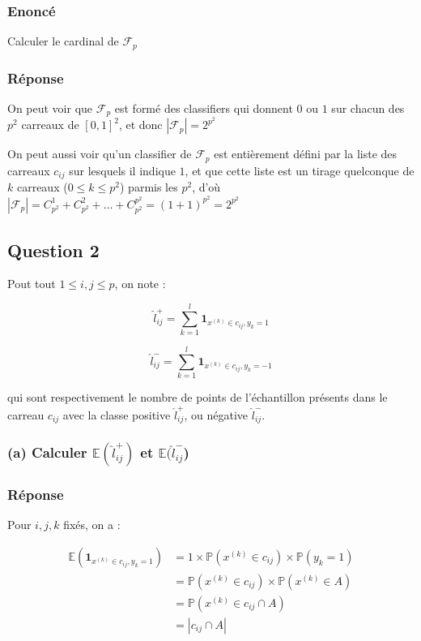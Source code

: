 \documentclass[french]{article}
\begin{document}
\subsubsection{Enoncé}

Calculer le cardinal de $\mathcal{F}_{p}$

\subsubsection{Réponse}

On peut voir que $\mathcal{F}_{p}$ est formé des classifiers qui donnent $0$ ou $1$ sur chacun des $ p^{2} $ carreaux de $[0,1]^{2}$, et donc $|\mathcal{F}_{p}| = 2^{p^{2}}$

On peut aussi voir qu'un classifier de $\mathcal{F}_{p}$ est entièrement défini par la liste des carreaux $ c_{ij} $ sur lesquels il indique $1$, et que cette liste est un tirage quelconque de $k$ carreaux ($0 \leq k \leq p^{2}$) parmis les $p^{2}$, d'où $|\mathcal{F}_{p}| = C_{p^{2}}^{1} + C_{p^{2}}^{2} + \hdots + C_{p^{2}}^{p^{2}} = (1+1)^{p^{2}} = 2^{p^{2}}$

\subsection{Question 2}

Pout tout $1 \leq i,j \leq p $, on note :

\[
\hat{l}_{ij}^{+} = \sum_{k=1}^{l}\mathbf{1}_{x^{(k)}\in c_{ij}, y_{k} = 1}
\]

\[
\hat{l}_{ij}^{-} = \sum_{k=1}^{l}\mathbf{1}_{x^{(k)}\in c_{ij}, y_{k} = -1}
\]

qui sont respectivement le nombre de points de l'échantillon présents dans le carreau $c_{ij}$ avec la classe positive $\hat{l}_{ij}^{+}$, ou négative $\hat{l}_{ij}^{-}$.

\subsubsection{(a) Calculer $\mathbb{E}(\hat{l}_{ij}^{+})$ et $\mathbb{E}(\hat{l}_{ij}^{-}$)}

\subsubsection{Réponse}

Pour $i,j,k$ fixés, on a :

\begin{align}
\mathbb{E}(\mathbf{1}_{{x^{(k)}}\in c_{ij}, y_{k} = 1}) &=
1 \times \mathbb{P}(x^{(k)}\in c_{ij}) \times \mathbb{P}(y_{k} = 1) 
\\ &=
\mathbb{P}(x^{(k)}\in c_{ij}) \times \mathbb{P}(x^{(k)}\in A) 
\\ &=
\mathbb{P}(x^{(k)}\in c_{ij} \cap A) 
\\ &=
|c_{ij} \cap A|
\end{align}
\end{document}
